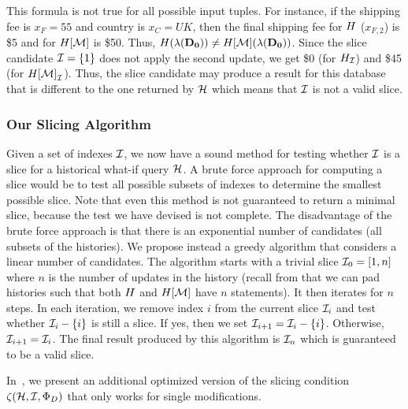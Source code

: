 \begin{exam}
This formula is not true for all possible input tuples. For instance, if the shipping fee is $x_{F} = 55$ and country is $x_{C} = UK$, then the final shipping fee for $H$ ($x_{F,2}$) is \$5 and for $H[\mathcal{M}]$ is \$50. Thus, $H(\lambda(\mathbf{D_0})) \neq H[\mathcal{M}](\lambda(\mathbf{D_0}))$. Since the slice candidate $\mathcal{I} = \{1\}$ does not apply the second update, we get \$0 (for $H_{\mathcal{I}}$) and \$45 (for ${H[\mathcal{M}]}_{\mathcal{I}}$). Thus, the slice candidate may produce a  result for this database that is different to the one returned by $\mathcal{H}$ which means that $\mathcal{I}$ is not a valid slice.
\end{exam}



\subsubsection{Our Slicing Algorithm}
\label{sec:finding-slice}
%
Given a set of indexes $\mathcal{I}$, we now have a sound method for testing whether $\mathcal{I}$ is a slice for a historical what-if query $\mathcal{H}$. A brute force approach for computing a slice would be to test all possible subsets of indexes to determine the smallest possible slice. Note that even this method is not guaranteed to return a minimal slice, because the test we have devised is not complete. The disadvantage of the brute force approach is that there is an exponential number of candidates (all subsets of the histories). We propose instead a greedy algorithm that considers a linear number of candidates. The algorithm starts with a trivial slice $\mathcal{I}_{0} = [1,n]$ where $n$ is the number of updates in the history (recall from  that we can pad histories such that both $H$ and $H[\mathcal{M}]$ have $n$ statements). It then iterates for $n$ steps. In each iteration, we remove index $i$ from the current slice $\mathcal{I}_{i}$ and test whether $\mathcal{I}_{i} - \{i\}$ is still a slice. If yes, then we set $\mathcal{I}_{i+1} = \mathcal{I}_{i} - \{i\}$. Otherwise, $\mathcal{I}_{i+1} = \mathcal{I}_{i}$. The final result produced by this algorithm is $\mathcal{I}_{n}$ which is guaranteed to be a valid slice.


In~\cite{techreport}, we present an additional optimized version of the slicing condition $\zeta({\mathcal{H}},{\mathcal{I}},{\Phi_{D}})$  that only works for single modifications.



